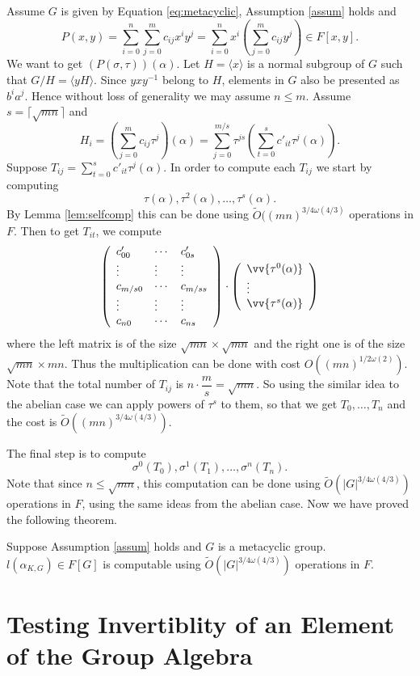 \documentclass[sigconf]{acmart}
\newcommand{\osum}[2]{\alpha_{#1,#2}}
\newcommand{\thecost}{\tilde{O}(\vert G \vert ^{3/4 \omega(4/3)})}
\theoremstyle{acmplain}
\begin{document}
 Assume $G$ is given by Equation \ref{eq:metacyclic}, Assumption \ref{assum} holds and 
 $$P(x,y) = \sum_{i= 0}^n \sum_{j=0}^m c_{ij}x^iy^j = \sum_{i= 0}^n x^i\left(\sum_{j=0}^m c_{ij}y^j \right) \in F[x,y]. $$
 We want to get $(P(\sigma,\tau))(\alpha)$. Let $H = \langle x \rangle$ is a normal subgroup of $G$ such that $G/H = \langle yH
  \rangle$. Since $yxy^{-1}$ belong to $H$, elements in $G$ also be presented as $b^i a^j$. Hence 
 without loss of generality we may assume $n \leq m$. Assume $s = \lceil \sqrt{mn} \rceil$ and
 $$H_i = (\sum_{j=0}^m c_{ij}\tau^j)(\alpha) = \sum_{j=0}^{m/ s} \tau^{js}\left(\sum_{t= 0}^{s}c'_{it}\tau^j(\alpha)\right).$$
 Suppose $T_{ij} = \sum_{t= 0}^{s}c'_{it}\tau^j(\alpha)$. In order to compute each $T_{ij}$ we start by computing 
 $$\tau(\alpha), \tau^2(\alpha), \ldots , \tau^{s}(\alpha).$$
 By Lemma \ref{lem:selfcomp} this can be done using $\tilde{O}((mn)^{3/4 \omega(4/3)}$ operations in $F$. Then to get $T_{it}$, we compute
 $$
\left(\begin{array}{lll}
c'_{00} & \cdots & c'_{0s}\\
\vdots & \vdots & \vdots\\
c_{m/s0} & \cdots & c_{m/ss}\\
\vdots & \vdots & \vdots\\
c_{n0} & \cdots & c_{ns}
\end{array} \right)
\cdot
\left( \begin{array}{l}
\vv{\tau^0(\alpha)}\\
\vdots\\
\vv{\tau^s(\alpha)}
\end{array}
\right)
 $$
 where the left matrix is of the size $\sqrt{mn} \times \sqrt{mn}$ and the right one is of the size $\sqrt{mn} \times mn$. Thus the 
 multiplication can be done with cost $O((mn)^{1/2 \omega(2)})$. Note that the total number of $T_{ij}$ is $n\cdot\dfrac{m}{s} = 
 \sqrt{mn}$. So using the similar idea to the abelian case we can apply powers of $\tau^s$ to them, so that we get 
 $T_0, \ldots, T_n$ and the cost is $\tilde{O}((mn)^{3/4\omega(4/3)})$.
 
 The final step is to compute $$\sigma^0(T_0), \sigma^1(T_1) , \ldots , \sigma^n (T_n).$$
Note that since $n \leq \sqrt{mn}$, this computation can be done using $\thecost$ operations in $F$, using the same ideas from the abelian case. Now we have proved the following theorem.

\begin{proposition}
Suppose Assumption \ref{assum} holds and $G$ is a metacyclic group. $l(\osum{K}{G}) \in F[G]$ is computable using $\thecost$ 
operations in $F$.
\end{proposition}

\section{Testing Invertiblity of an Element of the Group Algebra}




 
\end{document}

